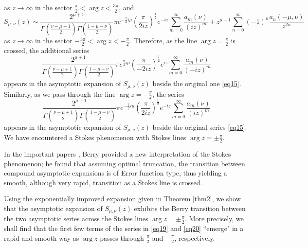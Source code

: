 \documentclass[a4paper,twoside,10pt]{amsart}
\numberwithin{equation}{section}
\begin{document}
as $z\to \infty$ in the sector $\frac{\pi}{2} < \arg z < \frac{3\pi}{2}$, and
\[
S_{\mu ,\nu } \left( z \right) \sim \frac{{2^{\mu  + 1} }}{{\Gamma \left( {\frac{{\nu  - \mu  + 1}}{2}} \right)\Gamma \left( {\frac{{1 - \mu  - \nu }}{2}} \right)}}\pi e^{ - \frac{\pi }{2}i\mu } \left( {\frac{\pi }{{2iz}}} \right)^{\frac{1}{2}} e^{ - iz} \sum\limits_{m = 0}^\infty  {\frac{{a_m \left( \nu  \right)}}{{\left( {iz} \right)^m }}}  + z^{\mu  - 1} \sum\limits_{n = 0}^\infty  {\left( { - 1} \right)^n \frac{{a_n \left( { - \mu ,\nu } \right)}}{{z^{2n} }}}
\]
as $z \to \infty$ in the sector $-\frac{3\pi}{2} < \arg z < -\frac{\pi}{2}$. Therefore, as the line $\arg z = \frac{\pi}{2}$ is crossed, the additional series
\begin{equation}\label{eq19}
\frac{{2^{\mu  + 1} }}{{\Gamma \left( {\frac{{\nu  - \mu  + 1}}{2}} \right)\Gamma \left( {\frac{{1 - \mu  - \nu }}{2}} \right)}}\pi e^{\frac{\pi }{2}i\mu } \left( {\frac{\pi }{{ - 2iz}}} \right)^{\frac{1}{2}} e^{iz} \sum\limits_{m = 0}^\infty  {\frac{{a_m \left( \nu  \right)}}{{\left( { - iz} \right)^m }}}
\end{equation}
appears in the asymptotic expansion of $S_{\mu ,\nu } \left( z \right)$ beside the original one \eqref{eq15}. Similarly, as we pass through the line $\arg z = -\frac{\pi}{2}$, the series
\begin{equation}\label{eq20}
\frac{{2^{\mu  + 1} }}{{\Gamma \left( {\frac{{\nu  - \mu  + 1}}{2}} \right)\Gamma \left( {\frac{{1 - \mu  - \nu }}{2}} \right)}}\pi e^{ - \frac{\pi }{2}i\mu } \left( {\frac{\pi }{{2iz}}} \right)^{\frac{1}{2}} e^{ - iz} \sum\limits_{m = 0}^\infty  {\frac{{a_m \left( \nu  \right)}}{{\left( {iz} \right)^m }}}
\end{equation}
appears in the asymptotic expansion of $S_{\mu ,\nu } \left( z \right)$ beside the original series \eqref{eq15}. We have encountered a Stokes phenomenon with Stokes lines $\arg z = \pm\frac{\pi}{2}$.

In the important papers \cite{Berry3, Berry2}, Berry provided a new interpretation of the Stokes phenomenon; he found that assuming optimal truncation, the transition between compound asymptotic expansions is of Error function type, thus yielding a smooth, although very rapid, transition as a Stokes line is crossed.

Using the exponentially improved expansion given in Theorem \ref{thm2}, we show that the asymptotic expansion of $S_{\mu ,\nu } \left( z \right)$ exhibits the Berry transition between the two asymptotic series across the Stokes lines $\arg z = \pm\frac{\pi}{2}$. More precisely, we shall find that the first few terms of the series in \eqref{eq19} and \eqref{eq20} ``emerge" in a rapid and smooth way as $\arg z$ passes through $\frac{\pi}{2}$ and $-\frac{\pi}{2}$, respectively.
\end{document}
